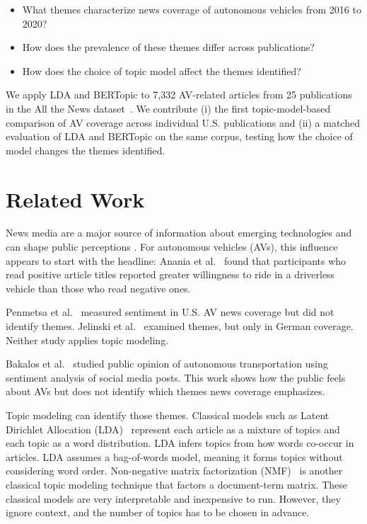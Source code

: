 \documentclass[conference]{IEEEtran}
\begin{document}
\begin{itemize}
    \item What themes characterize news coverage of autonomous vehicles from 2016 to 2020?
    \item How does the prevalence of these themes differ across publications?
    \item How does the choice of topic model affect the themes identified?
\end{itemize}

We apply LDA and BERTopic to 7,332 AV-related articles from 25 publications in the All the News dataset~\cite{mckinley2021}. We contribute (i) the first topic-model-based comparison of AV coverage across individual U.S. publications and (ii) a matched evaluation of LDA and BERTopic on the same corpus, testing how the choice of model changes the themes identified.


\section*{Related Work}
News media are a major source of information about emerging technologies and can shape public perceptions \cite{christen2007media}. For autonomous vehicles (AVs), this influence appears to start with the headline: Anania et al.~\cite{anania2018effects} found that participants who read positive article titles reported greater willingness to ride in a driverless vehicle than those who read negative ones.

Penmetsa et al.~\cite{penmetsa2023news} measured sentiment in U.S. AV news coverage but did not identify themes. Jelinski et al.~\cite{jelinski2021undifferentiated} examined themes, but only in German coverage. Neither study applies topic modeling.

Bakalos et al.~\cite{bakalos2020} studied public opinion of autonomous transportation using sentiment analysis of social media posts. This work shows how the public feels about AVs but does not identify which themes news coverage emphasizes.

Topic modeling can identify those themes. Classical models such as Latent Dirichlet Allocation (LDA)~\cite{blei2003lda} represent each article as a mixture of topics and each topic as a word distribution. LDA infers topics from how words co-occur in articles. LDA assumes a bag-of-words model, meaning it forms topics without considering word order. Non-negative matrix factorization (NMF)~\cite{lee1999nmf} is another classical topic modeling technique that factors a document-term matrix. These classical models are very interpretable and inexpensive to run. However, they ignore context, and the number of topics has to be chosen in advance.
\end{document}

